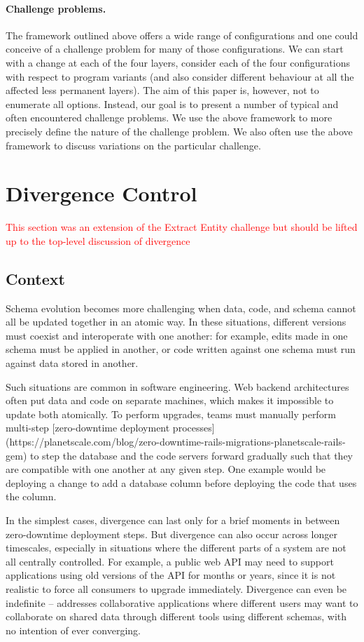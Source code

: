 \documentclass[english,submission]{programming}
\begin{document}
\paragraph{Challenge problems.}
The framework outlined above offers a wide range of configurations and one could conceive of
a challenge problem for many of those configurations. We can start with a change at each of the
four layers, consider each of the four configurations with respect to program variants (and also
consider different behaviour at all the affected less permanent layers). The aim of this paper
is, however, not to enumerate all options. Instead, our goal is to present a number of typical
and often encountered challenge problems. We use the above framework to more precisely define
the nature of the challenge problem. We also often use the above framework to discuss variations
on the particular challenge.


\section{Divergence Control}

\textcolor{red}{This section was an extension of the Extract Entity challenge but should be lifted up to the top-level discussion of divergence}

\subsection{Context}
Schema evolution becomes more challenging when data, code, and schema cannot all be updated together in an atomic way. In these situations, different versions must coexist and interoperate with one another: for example, edits made in one schema must be applied in another, or code written against one schema must run against data stored in another.

Such situations are common in software engineering. Web backend architectures often put data and code on separate machines, which makes it impossible to update both atomically. To perform upgrades, teams must manually perform multi-step [zero-downtime deployment processes](https://planetscale.com/blog/zero-downtime-rails-migrations-planetscale-rails-gem) to step the database and the code servers forward gradually such that they are compatible with one another at any given step. One example would be deploying a change to add a database column before deploying the code that uses the column.

In the simplest cases, divergence can last only for a brief moments in between zero-downtime deployment steps. But divergence can also occur across longer timescales, especially in situations where the different parts of a system are not all centrally controlled. For example, a public web API may need to support applications using old versions of the API for months or years, since it is not realistic to force all consumers to upgrade immediately. Divergence can even be indefinite -- \citet{Cambria} addresses collaborative applications where different users may want to collaborate on shared data through different tools using different schemas, with no intention of ever converging.
\end{document}
